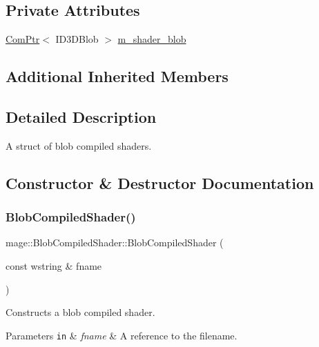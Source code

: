 \subsection*{Private Attributes}
\begin{DoxyCompactItemize}
\item 
\hyperlink{namespacemage_ae74f374780900893caa5555d1031fd79}{Com\+Ptr}$<$ I\+D3\+D\+Blob $>$ \hyperlink{structmage_1_1_blob_compiled_shader_a1a6959678592e3456ac8cb810dbdf648}{m\+\_\+shader\+\_\+blob}
\end{DoxyCompactItemize}
\subsection*{Additional Inherited Members}


\subsection{Detailed Description}
A struct of blob compiled shaders. 

\subsection{Constructor \& Destructor Documentation}
\hypertarget{structmage_1_1_blob_compiled_shader_a5bfb0954f48720eba4610816636ad1cb}{}\label{structmage_1_1_blob_compiled_shader_a5bfb0954f48720eba4610816636ad1cb} 
\subsubsection{\texorpdfstring{Blob\+Compiled\+Shader()}{BlobCompiledShader()}\hspace{0.1cm}{\footnotesize\ttfamily [1/3]}}
{\footnotesize\ttfamily mage\+::\+Blob\+Compiled\+Shader\+::\+Blob\+Compiled\+Shader (\begin{DoxyParamCaption}\item[{const wstring \&}]{fname }\end{DoxyParamCaption})\hspace{0.3cm}{\ttfamily [explicit]}}

Constructs a blob compiled shader.


\begin{DoxyParams}[1]{Parameters}
\mbox{\tt in}  & {\em fname} & A reference to the filename. \\
\hline
\end{DoxyParams}

